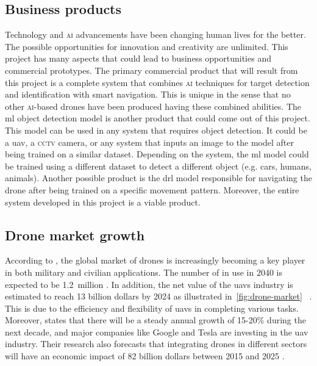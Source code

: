 \documentclass[../main.tex]{subfiles}
\begin{document}
\subsection{Business products}
        Technology and \textsc{ai} advancements have been changing human lives for the better.
	The possible opportunities for innovation and creativity are unlimited. This
	project has many aspects that could lead to business opportunities and commercial
	prototypes. 
        The primary commercial product that 
        will result from this 
        project is a complete \uav system that combines 
        \textsc{ai} techniques for target detection and
        identification with smart navigation. 
        This is unique in the sense that no other 
        \textsc{ai}-based drones have been produced 
        having these combined abilities.
	The \gls{ml} object detection model is another
        product that could come out of this project. 
        This model can be used in any system
	that requires object detection. It could be a \gls{uav}, a \textsc{cctv} camera, or
	any system that inputs an image to the model after being trained on a similar 
	dataset.
	Depending on the system, the \gls{ml} model could be trained using a different
	dataset to detect a different object (e.g. cars, humans, animals).
	Another possible product is the \gls{drl} model responsible for navigating the
	drone after being trained on a specific movement pattern.
	Moreover, the entire system developed in this project is a viable product.
	
\subsection{Drone market growth}
	According to \textcite{Atwater15Commercial}, the global market of drones is 
	increasingly becoming a key player in both military and civilian applications. 
        The number of \uavs in use in 2040 is expected to 
        be \SI{1.2}{million} \cite{Amo19}. In addition,
	the net value of the \glspl{uav} industry is estimated to reach 13 billion dollars
	by 2024 as illustrated in~\cref{fig:drone-market}%
        ~\cite{Mic14}. This is due to the efficiency 
	and flexibility of \glspl{uav} in completing various tasks. 
	Moreover, \textcite{Yes19} states that there will be a steady annual growth of 
	15-20\% during the next decade, and major companies like Google and Tesla are investing
	in the \gls{uav} industry. Their research also forecasts that integrating drones in
	different sectors will have an economic impact of 82 billion dollars between 2015 
        and 2025 \cite{Yes19}.
	
\end{document}
